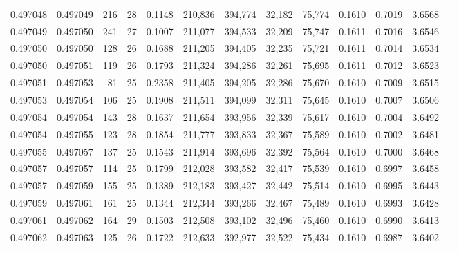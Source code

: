 \begin{tabular}{rrrrrrrrrrrrr}
0.497048 & 0.497049 & 216 &  28 &                                     0.1148 & 210,836 & 394,774 &  32,182 &  75,774 & 0.1610 & 0.7019 & 3.6568 \\
0.497049 & 0.497050 & 241 &  27 &                                     0.1007 & 211,077 & 394,533 &  32,209 &  75,747 & 0.1611 & 0.7016 & 3.6546 \\
0.497050 & 0.497050 & 128 &  26 &                                     0.1688 & 211,205 & 394,405 &  32,235 &  75,721 & 0.1611 & 0.7014 & 3.6534 \\
0.497050 & 0.497051 & 119 &  26 &                                     0.1793 & 211,324 & 394,286 &  32,261 &  75,695 & 0.1611 & 0.7012 & 3.6523 \\
0.497051 & 0.497053 &  81 &  25 &                                     0.2358 & 211,405 & 394,205 &  32,286 &  75,670 & 0.1610 & 0.7009 & 3.6515 \\
0.497053 & 0.497054 & 106 &  25 &                                     0.1908 & 211,511 & 394,099 &  32,311 &  75,645 & 0.1610 & 0.7007 & 3.6506 \\
0.497054 & 0.497054 & 143 &  28 &                                     0.1637 & 211,654 & 393,956 &  32,339 &  75,617 & 0.1610 & 0.7004 & 3.6492 \\
0.497054 & 0.497055 & 123 &  28 &                                     0.1854 & 211,777 & 393,833 &  32,367 &  75,589 & 0.1610 & 0.7002 & 3.6481 \\
0.497055 & 0.497057 & 137 &  25 &                                     0.1543 & 211,914 & 393,696 &  32,392 &  75,564 & 0.1610 & 0.7000 & 3.6468 \\
0.497057 & 0.497057 & 114 &  25 &                                     0.1799 & 212,028 & 393,582 &  32,417 &  75,539 & 0.1610 & 0.6997 & 3.6458 \\
0.497057 & 0.497059 & 155 &  25 &                                     0.1389 & 212,183 & 393,427 &  32,442 &  75,514 & 0.1610 & 0.6995 & 3.6443 \\
0.497059 & 0.497061 & 161 &  25 &                                     0.1344 & 212,344 & 393,266 &  32,467 &  75,489 & 0.1610 & 0.6993 & 3.6428 \\
0.497061 & 0.497062 & 164 &  29 &                                     0.1503 & 212,508 & 393,102 &  32,496 &  75,460 & 0.1610 & 0.6990 & 3.6413 \\
0.497062 & 0.497063 & 125 &  26 &                                     0.1722 & 212,633 & 392,977 &  32,522 &  75,434 & 0.1610 & 0.6987 & 3.6402 \\

\end{tabular}
